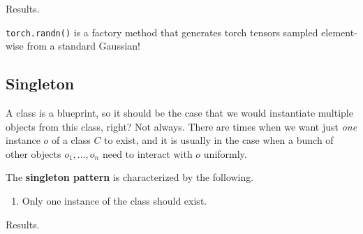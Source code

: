   Results. 

  \begin{example}
    
  \end{example}

  \begin{example}
    \texttt{torch.randn()} is a factory method that generates torch tensors sampled element-wise from a standard Gaussian! 
  \end{example}

\subsection{Singleton} 

  A class is a blueprint, so it should be the case that we would instantiate multiple objects from this class, right? Not always. There are times when we want just \textit{one} instance $o$ of a class $C$ to exist, and it is usually in the case when a bunch of other objects $o_1, \ldots, o_n$ need to interact with $o$ uniformly. 

  \begin{definition}[Singleton]
    The \textbf{singleton pattern} is characterized by the following. 
    \begin{enumerate}
      \item Only one instance of the class should exist. 
    \end{enumerate}
  \end{definition}

  Results. 

